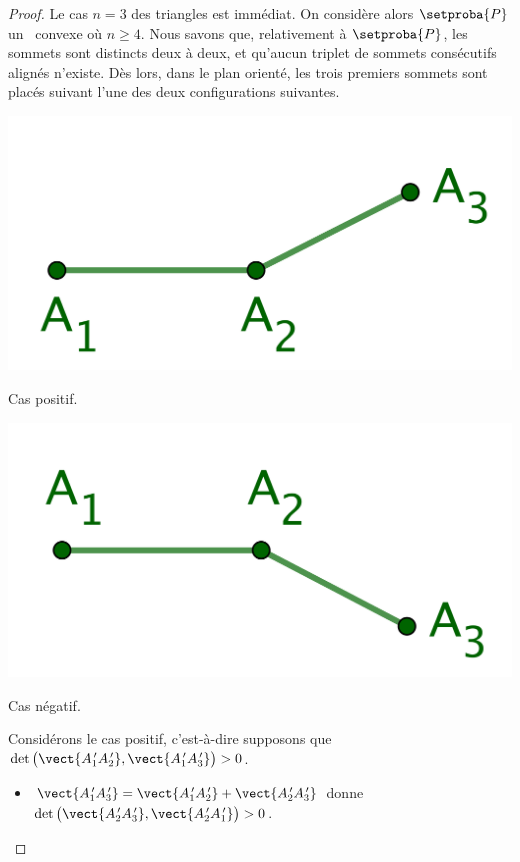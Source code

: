 \begin{proof}
	Le cas $n = 3$ des triangles est immédiat.
	On considère alors $\setproba{P}$ un \ngone\ convexe où  $n \geq 4$.
	Nous savons que, relativement à $\setproba{P}$, les sommets sont distincts deux à deux, et qu'aucun triplet de sommets consécutifs alignés n'existe.
	Dès lors, dans le plan orienté, les trois premiers sommets sont placés suivant l'une des deux configurations suivantes. 
    
    \begin{multicols}{2}
        \small\itshape\centering
       	\includegraphics[scale=.45]{content/polygon/at-least-one/conv-det-sign-1.png}
    	    
    	\smallskip
        Cas positif.
        
        \includegraphics[scale=.45]{content/polygon/at-least-one/conv-det-sign-2.png}
    	    
    	\smallskip
        Cas négatif.
    \end{multicols}

    
    \noindent
    Considérons le cas positif, c'est-à-dire supposons que 
    $\det \big( \vect{A^{\,\prime}_1 A^{\,\prime}_2}, \vect{A^{\,\prime}_1 A^{\,\prime}_3} \big) > 0$.
	\begin{itemize}
    	\item $\vect{A^{\,\prime}_1 A^{\,\prime}_3} = \vect{A^{\,\prime}_1 A^{\,\prime}_2} + \vect{A^{\,\prime}_2 A^{\,\prime}_3}$
    	donne
		$\det \big( \vect{A^{\,\prime}_2 A^{\,\prime}_3}, \vect{A^{\,\prime}_2 A^{\,\prime}_1} \big) > 0$.



\end{itemize}
\end{proof}
